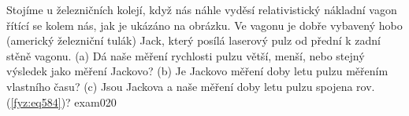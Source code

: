 \begin{fyzexam}{Stojíme u železničních kolejí, když nás náhle vyděsí relativistický nákladní vagon
  řítící se kolem nás, jak je ukázáno na obrázku. Ve vagonu je dobře vybavený hobo (americký
  železniční tulák) Jack, který posílá laserový pulz od přední k zadní stěně vagonu. (a) Dá naše
  měření rychlosti pulzu větší, menší, nebo stejný výsledek jako měření Jackovo? (b) Je Jackovo
  měření doby letu pulzu měřením vlastního času? (c) Jsou Jackova a naše měření doby letu pulzu
  spojena rov. (\ref{fyz:eq584})? \cite[s.~1013]{Halliday2001}}{exam020} 

  {\centering
  \captionsetup{type=figure}
  \par}  
\end{fyzexam}